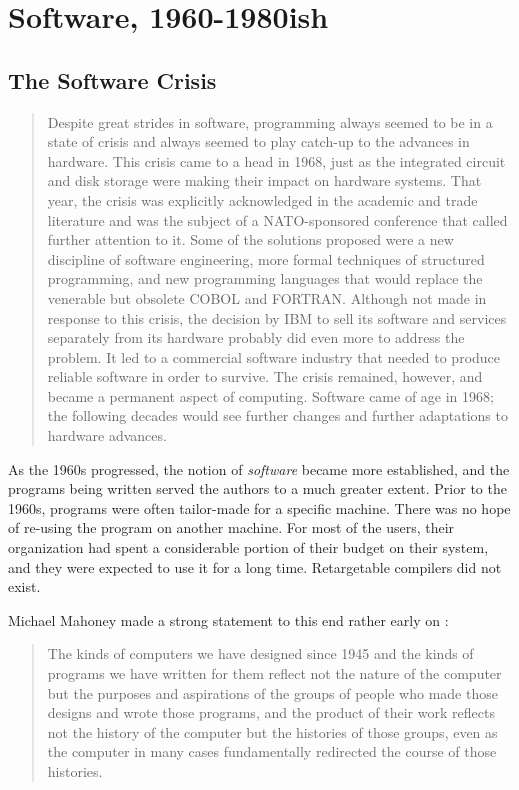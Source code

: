 \chapter{Software, 1960-1980ish}


\section{The Software Crisis}
\begin{quotation}
Despite great strides in software, programming always seemed to be in a state 
of crisis and always seemed to play catch-up to the advances in hardware. This 
crisis came to a head in 1968, just as the integrated circuit and disk storage 
were making their impact on hardware systems. That year, the crisis was 
explicitly acknowledged in the academic and trade literature and was the 
subject of a NATO-sponsored conference that called further attention to it. 
Some of the solutions proposed were a new discipline of software engineering, 
more formal techniques of structured programming, and new programming languages 
that would replace the venerable but obsolete COBOL and FORTRAN. Although not 
made in response to this crisis, the decision by IBM to sell its software and 
services separately from its hardware probably did even more to address the 
problem. It led to a commercial software industry that needed to produce 
reliable software in order to survive. The crisis remained, however, and became 
a permanent aspect of computing. Software came of age in 1968; the following 
decades would see further changes and further adaptations to hardware advances.
\cite{history_of_modern_computing_2003_ceruzzi}
\end{quotation}


As the 1960s progressed, the notion of \textit{software} became more established,
and the programs being written served the authors to a much greater extent.
Prior to the 1960s, programs were often tailor-made for a specific machine.
There was no hope of re-using the program on another machine.
For most of the users, their organization had spent a considerable portion
of their budget on their system, and they were expected to use it for a long time.
Retargetable compilers did not exist.

Michael Mahoney made a strong statement to this end rather early on \cite[The Structures of Computation]{the-first-computers-2002}:
\begin{quotation}
The kinds of computers we have designed since 1945 and the kinds of programs we 
have written for them reflect not the nature of the computer but the purposes 
and aspirations of the groups of people who made those designs and wrote those 
programs, and the product of their work reflects not the history of the 
computer but the histories of those groups, even as the computer in many cases 
fundamentally redirected the course of those histories.
\end{quotation}

